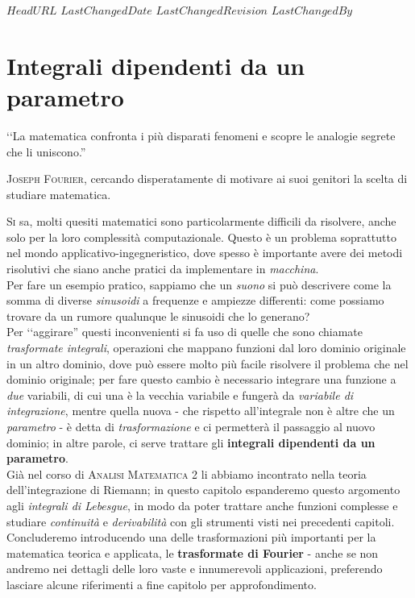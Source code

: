 \svnidlong
{$HeadURL$}
{$LastChangedDate$}
{$LastChangedRevision$}
{$LastChangedBy$}

\chapter{Integrali dipendenti da un parametro}

\begin{introduction}
	‘‘La matematica confronta i più disparati fenomeni e scopre le analogie segrete che li uniscono.''
	\begin{flushright}
		\textsc{Joseph Fourier,} cercando disperatamente di motivare ai suoi genitori la scelta di studiare matematica.
	\end{flushright}
\end{introduction}
\lettrine[findent=1pt, nindent=0pt]{S}{i} sa, molti quesiti matematici sono particolarmente difficili da risolvere, anche solo per la loro complessità computazionale. Questo è un problema soprattutto nel mondo applicativo-ingegneristico, dove spesso è importante avere dei metodi risolutivi che siano anche pratici da implementare in \textit{macchina}.\\
Per fare un esempio pratico, sappiamo che un \textit{suono} si può descrivere come la somma di diverse \textit{sinusoidi} a frequenze e ampiezze differenti: come possiamo trovare da un rumore qualunque le sinusoidi che lo generano?\\
Per ‘‘aggirare'' questi inconvenienti si fa uso di quelle che sono chiamate \textit{trasformate integrali}, operazioni che mappano funzioni dal loro dominio originale in un altro dominio, dove può essere molto più facile risolvere il problema che nel dominio originale; per fare questo cambio è necessario integrare una funzione a \textit{due} variabili, di cui una è la vecchia variabile e fungerà da \textit{variabile di integrazione}, mentre quella nuova - che rispetto all'integrale non è altre che un \textit{parametro} - è detta di \textit{trasformazione} e ci permetterà il passaggio al nuovo dominio; in altre parole, ci serve trattare gli \textbf{integrali dipendenti da un parametro}.\\
Già nel corso di \textsc{Analisi Matematica 2} li abbiamo incontrato nella teoria dell'integrazione di Riemann; in questo capitolo espanderemo questo argomento agli \textit{integrali di Lebesgue}, in modo da poter trattare anche funzioni complesse e studiare \textit{continuità} e \textit{derivabilità} con gli strumenti visti nei precedenti capitoli. Concluderemo introducendo una delle trasformazioni più importanti per la matematica teorica e applicata, le \textbf{trasformate di Fourier} - anche se non andremo nei dettagli delle loro vaste e innumerevoli applicazioni, preferendo lasciare alcune riferimenti a fine capitolo per approfondimento.
